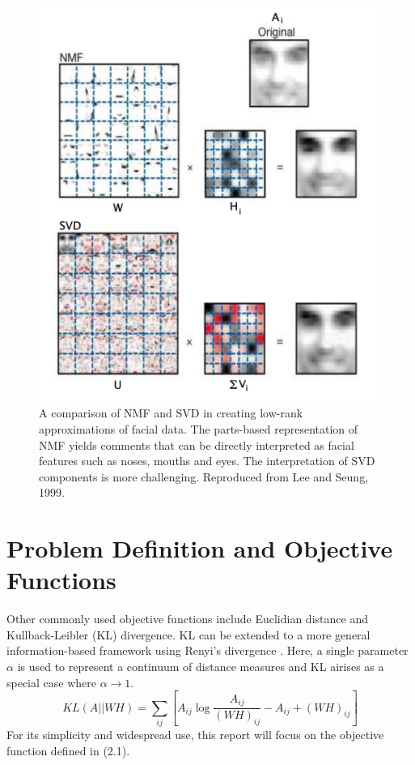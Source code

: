 \documentclass[final,leqno,onefignum,onetabnum]{siamltex1213}
\begin{document}
\begin{figure}[t!]
  \centering
    \includegraphics[width=.5\linewidth]{NMF_faces_Lee_Seung_1999}
  \caption{A comparison of NMF and SVD in creating low-rank approximations of facial data. The parts-based representation of NMF yields comments that can be directly interpreted as facial features such as noses, mouths and eyes. The interpretation of SVD components is more challenging. Reproduced from Lee and Seung, 1999.}
\end{figure}

\section{Problem Definition and Objective Functions}

Other commonly used objective functions include Euclidian distance and Kullback-Leibler (KL) divergence. KL can be extended to a more general information-based framework using Renyi's divergence \cite{Dev1}. Here, a single parameter $\alpha$ is used to represent a continuum of distance measures and KL airises as a special case where $\alpha {}$. 
\begin{equation}\label{ObjKL}
 KL(A || WH) = \sum_{ij}{[A_{ij} \log{ \frac{A_{ij}}{(WH)_{ij}} - A_{ij} + (WH)_{ij}} ]}
\end{equation}
For its simplicity and widespread use, this report will focus on the objective function defined in (2.1). 
\end{document}
